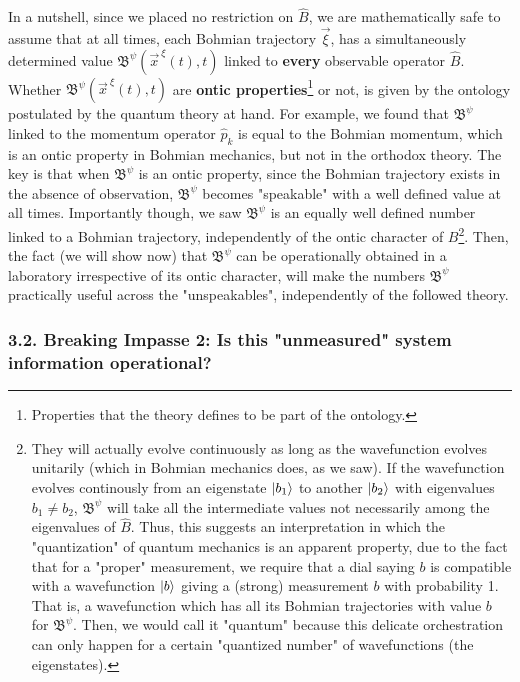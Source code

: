 \documentclass[11pt, a4paper]{article} %
\newcommand{\B}{\mathfrak{B}}
\begin{document}
In a nutshell, since we placed no restriction on $\hat{B}$, we are mathematically safe to assume that at all times, each Bohmian trajectory $\vec{\xi}$, has a simultaneously determined value $\B^\psi(\vec{x}^{\:\xi}(t),t)$ linked to {\bf every} observable operator $\hat{B}$. Whether $\B^\psi(\vec{x}^{\:\xi}(t),t)$ are \textbf{ontic properties}\footnote{Properties that the theory defines to be part of the ontology.} or not, is given by the ontology postulated by the quantum theory at hand. For example, we found that $\B^\psi$ linked to the momentum operator $\hat{p}_k$ is equal to the Bohmian momentum, which is an ontic property in Bohmian mechanics, but not in the orthodox theory. The key is that when $\B^\psi$ is an ontic property, since the Bohmian trajectory exists in the absence of observation, $\B^\psi$ becomes "speakable" with a well defined value at all times. Importantly though, we saw $\B^\psi$ is an equally well defined number linked to a Bohmian trajectory, independently of the ontic character of $B$\footnote{They will actually evolve continuously as long as the wavefunction evolves unitarily (which in Bohmian mechanics does, as we saw). If the wavefunction evolves continously from an eigenstate $\ket{b_1}$ to another $\ket{b_2}$ with eigenvalues $b_1\neq b_2$, $\B^\psi$ will take all the intermediate values not necessarily among the eigenvalues of $\hat{B}$. Thus, this suggests an interpretation in which the "quantization" of quantum mechanics is an apparent property, due to the fact that for a "proper" measurement, we require that a dial saying $b$ is compatible with a wavefunction $\ket{b}$ giving a (strong) measurement $b$ with probability 1. That is, a wavefunction which has all its Bohmian trajectories with value $b$ for $\B^\psi$. Then, we would call it "quantum" because this delicate orchestration can only happen for a certain "quantized number" of wavefunctions (the eigenstates).}. Then, the fact (we will show now) that $\B^\psi$ can be operationally obtained in a laboratory irrespective of its ontic character, will make the numbers $\B^\psi$ practically useful across the "unspeakables", independently of the followed theory.


 
\subsubsection*{3.2. Breaking Impasse 2: Is this "unmeasured" system information operational?}\vspace{-0.15cm}
\end{document}
